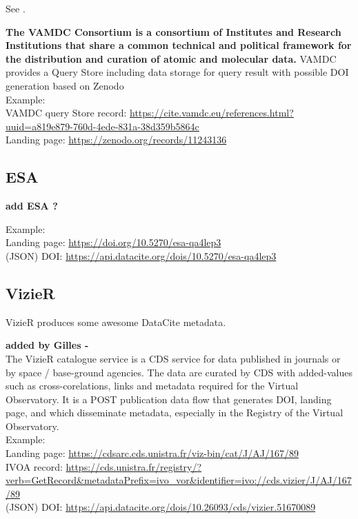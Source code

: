 \documentclass[11pt,a4paper]{ivoa}
\begin{document}
See \citep{2018Galax...6..105M}.

\textbf{\color{red} The VAMDC Consortium is a consortium of Institutes and Research Institutions that share a common technical and political framework for the distribution and curation of atomic and molecular data.}
{\color{red} 
VAMDC provides a Query Store including data storage for query result with possible DOI generation based on Zenodo}\\

Example:\\
VAMDC query Store record: \url{https://cite.vamdc.eu/references.html?uuid=a819e879-760d-4ede-831a-38d359b5864c}\\
Landing page: \url{https://zenodo.org/records/11243136}

\subsection{ESA}
\textbf{\color{red}  add ESA ?}

Example:\\
Landing page: \url{https://doi.org/10.5270/esa-qa4lep3}\\
(JSON) DOI: \url{https://api.datacite.org/dois/10.5270/esa-qa4lep3}

\subsection{VizieR}
VizieR produces some awesome DataCite metadata.


\textbf{\color{red} added by Gilles - }\\

The VizieR catalogue service is a CDS service for data published in journals or by space / base-ground agencies. The data are curated by CDS with added-values such as cross-corelations, links and metadata required for the Virtual Observatory. It is a POST publication data flow that generates DOI, landing page, and which disseminate metadata, especially in the Registry of the Virtual Observatory.\\


Example:\\
Landing page: \url{https://cdsarc.cds.unistra.fr/viz-bin/cat/J/AJ/167/89}\\
IVOA record: \url{https://cds.unistra.fr/registry/?verb=GetRecord&metadataPrefix=ivo_vor&identifier=ivo://cds.vizier/J/AJ/167/89}\\
(JSON) DOI: \url{https://api.datacite.org/dois/10.26093/cds/vizier.51670089}
\end{document}
